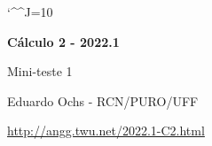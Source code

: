 \documentclass[oneside,12pt]{article}
\begin{document}
\catcode`\^^J=10
\pu
\def\pictgridstyle{\color{GrayPale}\linethickness{0.3pt}}
\def\pictaxesstyle{\linethickness{0.5pt}}
\celllower=2.5pt


\def\u#1{\par{\footnotesize \url{#1}}}

\def\drafturl{http://angg.twu.net/LATEX/2022-1-C2.pdf}
\def\drafturl{http://angg.twu.net/2022.1-C2.html}
\def\draftfooter{\tiny \href{\drafturl}{\jobname{}} \ColorBrown{\shorttoday{} \hours}}



%

\thispagestyle{empty}

\begin{center}

\vspace*{1.2cm}

{\bf \Large Cálculo 2 - 2022.1}

\bsk

Mini-teste 1

\bsk

Eduardo Ochs - RCN/PURO/UFF

\url{http://angg.twu.net/2022.1-C2.html}

\end{center}

\newpage

\end{document}

